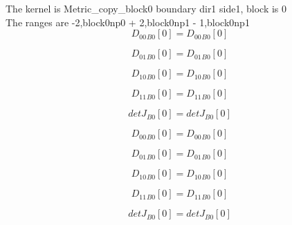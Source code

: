 \documentclass{article}
\begin{document}
\noindent The kernel is Metric_copy_block0 boundary dir1 side1, block is 0\\\noindent The ranges are -2,block0np0 + 2,block0np1 - 1,block0np1\\\begin{dmath}{D_{00}{_{B0}}}[{0}] = {D_{00}{_{B0}}}[{0}]\end{dmath}

\begin{dmath}{D_{01}{_{B0}}}[{0}] = {D_{01}{_{B0}}}[{0}]\end{dmath}

\begin{dmath}{D_{10}{_{B0}}}[{0}] = {D_{10}{_{B0}}}[{0}]\end{dmath}

\begin{dmath}{D_{11}{_{B0}}}[{0}] = {D_{11}{_{B0}}}[{0}]\end{dmath}

\begin{dmath}{detJ{_{B0}}}[{0}] = {detJ{_{B0}}}[{0}]\end{dmath}

\begin{dmath}{D_{00}{_{B0}}}[{0}] = {D_{00}{_{B0}}}[{0}]\end{dmath}

\begin{dmath}{D_{01}{_{B0}}}[{0}] = {D_{01}{_{B0}}}[{0}]\end{dmath}

\begin{dmath}{D_{10}{_{B0}}}[{0}] = {D_{10}{_{B0}}}[{0}]\end{dmath}

\begin{dmath}{D_{11}{_{B0}}}[{0}] = {D_{11}{_{B0}}}[{0}]\end{dmath}

\begin{dmath}{detJ{_{B0}}}[{0}] = {detJ{_{B0}}}[{0}]\end{dmath}
\end{document}
